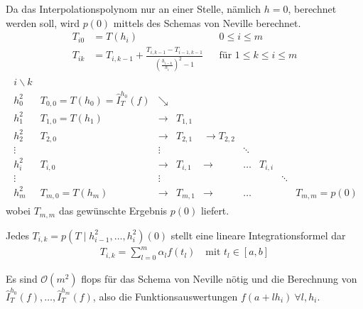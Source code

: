 Da das Interpolationspolynom nur an einer Stelle,
nämlich $h=0$, berechnet werden soll,
wird $p(0)$ mittels des Schemas von Neville berechnet.
\begin{align}\nonumber
  T_{i0} &= T(h_i) &&0\leq i\leq m \\
  T_{ik} &= T_{i,k-1} 
           + \frac{T_{i,k-1}-T_{i-1,k-1}}
           {\left(\frac{h_{i-k}}{h_i}\right)^2-1} 
                   &&\text{für } 1\leq k\leq i\leq m
                      \label{VII.3.6}
\end{align}
\begin{align*}
  \begin{array}{clccccccl}
    i\backslash k \\
    h_0^2 & T_{0,0}=T(h_0)=\hat{I}_T^{h_0}(f) & \searrow \\
    h_1^2 & T_{1,0}=T(h_1) & \longrightarrow & T_{1,1}\\
    h_2^2 & T_{2,0}& \longrightarrow &T_{2,1} & \longrightarrow T_{2,2} \\
    \vdots&&\vdots&&& \ddots\\
    h_i^2 & T_{i,0} & \longrightarrow & T_{i,1} & \longrightarrow & \dots &
                                                                             T_{i,i}\\
    \vdots&&\vdots&&&&& \ddots\\
    h_m^2 & T_{m,0}=T(h_m)&\longrightarrow & T_{m,1} &\longrightarrow &\dots&&&T_{m,m}=p(0)
  \end{array}
\end{align*}
wobei $T_{m,m}$ das gewünschte Ergebnis $p(0)$ liefert.

\begin{Beme}\label{7.3.3}
  Jedes $T_{i,k}=p(T\mid h_{i-1}^2,\dotsc, h_i^2)(0)$ 
  stellt eine lineare Integrationsformel dar
  \begin{gather*}
    T_{i,k}=\sum_{l=0}^m \alpha_lf(t_l)
    \quad \text{mit } t_l\in[a,b]
  \end{gather*}
\end{Beme}

\label{7.3.4}
Es sind $\mathcal{O}(m^2)$ flops für das Schema von Neville nötig
und die Berechnung von 
$\hat{I}_T^{h_0}(f),\dotsc, \hat{I}_T^{h_m}(f)$,
also die Funktionsauswertungen $f(a+lh_i)~\forall l,h_i$.


